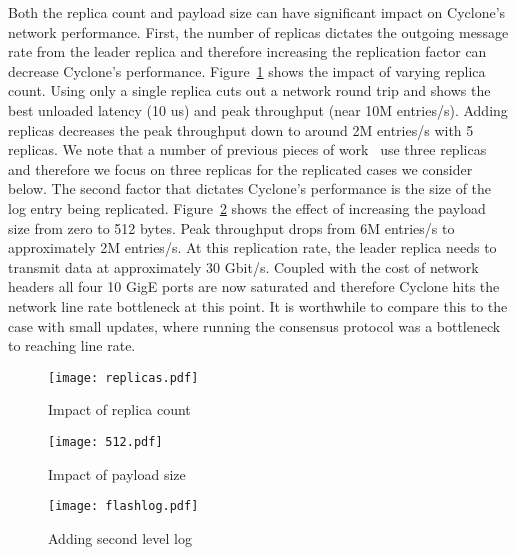 \documentclass[twocolumn]{article}
\begin{document}
Both the replica count and payload size can have significant impact on Cyclone's
network performance. First, the number of replicas dictates the outgoing message
rate from the leader replica and therefore increasing the replication factor can
decrease Cyclone's performance. Figure~\ref{fig:replicas} shows the impact of
varying replica count. Using only a single replica cuts out a network round trip
and shows the best unloaded latency (10 us) and peak throughput (near 10M
entries/s). Adding replicas decreases the peak throughput down to around 2M
entries/s with 5 replicas. We note that a number of previous pieces of
work~\cite{faast, farm} use three replicas and therefore we focus on three
replicas for the replicated cases we consider below. The second factor that
dictates Cyclone's performance is the size of the log entry being
replicated. Figure~\ref{fig:payload} shows the effect of increasing the payload
size from zero to 512 bytes. Peak throughput drops from 6M entries/s to
approximately 2M entries/s. At this replication rate, the leader replica needs
to transmit data at approximately 30 Gbit/s. Coupled with the cost of network
headers all four 10 GigE ports are now saturated and therefore Cyclone hits the
network line rate bottleneck at this point. It is worthwhile to compare this to
the case with small updates, where running the consensus protocol was a
bottleneck to reaching line rate.

\begin{figure}
  \texttt{[image: replicas.pdf]}
  \caption{Impact of replica count}
  \label{fig:replicas}
\end{figure}

\begin{figure}
  \texttt{[image: 512.pdf]}
  \caption{Impact of payload size}
  \label{fig:payload}
\end{figure}

\begin{figure}
  \texttt{[image: flashlog.pdf]}
  \caption{Adding second level log}
  \label{fig:flashlog}
\end{figure}
\end{document}
